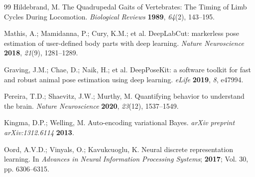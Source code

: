 \documentclass[computers,article,submit,pdftex,moreauthors]{mdpi}
\begin{document}
\begin{thebibliography}{99}
 Hildebrand, M. The Quadrupedal Gaits of Vertebrates: The Timing of Limb Cycles During Locomotion. \textit{Biological Reviews} \textbf{1989}, \textit{64}(2), 143--195.

 Mathis, A.; Mamidanna, P.; Cury, K.M.; et al. DeepLabCut: markerless pose estimation of user-defined body parts with deep learning. \textit{Nature Neuroscience} \textbf{2018}, \textit{21}(9), 1281--1289.

 Graving, J.M.; Chae, D.; Naik, H.; et al. DeepPoseKit: a software toolkit for fast and robust animal pose estimation using deep learning. \textit{eLife} \textbf{2019}, \textit{8}, e47994.

 Pereira, T.D.; Shaevitz, J.W.; Murthy, M. Quantifying behavior to understand the brain. \textit{Nature Neuroscience} \textbf{2020}, \textit{23}(12), 1537--1549.

 Kingma, D.P.; Welling, M. Auto-encoding variational Bayes. \textit{arXiv preprint arXiv:1312.6114} \textbf{2013}.

 Oord, A.V.D.; Vinyals, O.; Kavukcuoglu, K. Neural discrete representation learning. In \textit{Advances in Neural Information Processing Systems}; \textbf{2017}; Vol. 30, pp. 6306--6315.

\end{thebibliography}
\end{document}

